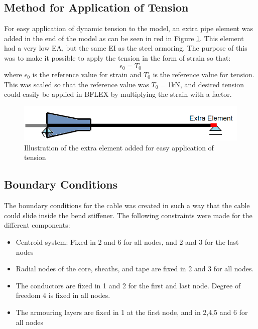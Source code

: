 \subsection{Method for Application of Tension}
\noindent For easy application of dynamic tension to the model, an extra pipe element was added in the end of the model as can be seen in red in Figure \ref{fig:exelem}. This element had a very low EA, but the same EI as the steel armoring. The purpose of this was to make it possible to apply the tension in the form of strain so that:
\begin{equation}
    \epsilon_0 = T_0
\end{equation}
where $\epsilon_0$ is the reference value for strain and $T_0$ is the reference value for tension. This was scaled so that the reference value was $T_0=$1kN, and desired tension could easily be applied in BFLEX by multiplying the strain with a factor. 
\begin{figure}[H]
\centering
\includegraphics[scale=0.8]{figures/exelem}
\caption[Illustration of the extra element added for easy application of tension]{Illustration of the extra element added for easy application of tension}
 \label{fig:exelem}
\end{figure}

\subsection{Boundary Conditions}
The boundary conditions for the cable was created in such a way that the cable could slide inside the bend stiffener. The following constraints were made for the different components:
\begin{itemize}
    \item Centroid system: Fixed in 2 and 6 for all nodes, and 2 and 3 for the last nodes
    \item Radial nodes of the core, sheaths, and tape are fixed in 2 and 3 for all nodes. 
    \item The conductors are fixed in 1 and 2 for the first and last node. Degree of freedom 4 is fixed in all nodes.
    \item The armouring layers are fixed in 1 at the first node, and in 2,4,5 and 6 for all nodes
\end{itemize}

